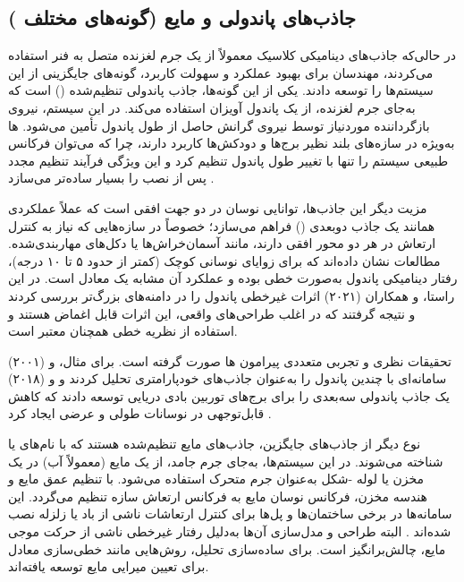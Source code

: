 \subsection{جاذب‌های پاندولی و مایع (گونه‌های مختلف )}

در حالی‌که جاذب‌های دینامیکی کلاسیک معمولاً از یک جرم لغزنده متصل به فنر استفاده می‌کردند، مهندسان برای بهبود عملکرد و سهولت کاربرد، گونه‌های جایگزینی از این سیستم‌ها را توسعه دادند. یکی از این گونه‌ها، جاذب پاندولی تنظیم‌شده () است که به‌جای جرم لغزنده، از یک پاندول آویزان استفاده می‌کند. در این سیستم، نیروی بازگرداننده موردنیاز توسط نیروی گرانش حاصل از طول پاندول تأمین می‌شود. ها به‌ویژه در سازه‌های بلند نظیر برج‌ها و دودکش‌ها کاربرد دارند، چرا که می‌توان فرکانس طبیعی سیستم را تنها با تغییر طول پاندول تنظیم کرد و این ویژگی فرآیند تنظیم مجدد پس از نصب را بسیار ساده‌تر می‌سازد \cite{saeed2023review, sun2018bi}.

مزیت دیگر این جاذب‌ها، توانایی نوسان در دو جهت افقی است که عملاً عملکردی همانند یک جاذب دوبعدی () فراهم می‌سازد؛ خصوصاً در سازه‌هایی که نیاز به کنترل ارتعاش در هر دو محور افقی دارند، مانند آسمان‌خراش‌ها یا دکل‌های مهاربندی‌شده. مطالعات نشان داده‌اند که برای زوایای نوسانی کوچک (کمتر از حدود ۵ تا ۱۰ درجه)، رفتار دینامیکی پاندول به‌صورت خطی بوده و عملکرد آن مشابه یک  معادل است. در این راستا،  و همکاران (۲۰۲۱) اثرات غیرخطی پاندول را در دامنه‌های بزرگ‌تر بررسی کردند و نتیجه گرفتند که در اغلب طراحی‌های واقعی، این اثرات قابل اغماض هستند و استفاده از نظریه خطی همچنان معتبر است.

تحقیقات نظری و تجربی متعددی پیرامون ها صورت گرفته است. برای مثال،  و  (۲۰۰۱) سامانه‌ای با چندین پاندول را به‌عنوان جاذب‌های خودپارامتری تحلیل کردند و  و  (۲۰۱۸) یک جاذب پاندولی سه‌بعدی را برای برج‌های توربین بادی دریایی توسعه دادند که کاهش قابل‌توجهی در نوسانات طولی و عرضی ایجاد کرد \cite{saeed2023review}.

نوع دیگر از جاذب‌های جایگزین، جاذب‌های مایع تنظیم‌شده هستند که با نام‌های  یا  شناخته می‌شوند. در این سیستم‌ها، به‌جای جرم جامد، از یک مایع (معمولاً آب) در یک مخزن یا لوله -شکل به‌عنوان جرم متحرک استفاده می‌شود. با تنظیم عمق مایع و هندسه مخزن، فرکانس نوسان مایع به فرکانس ارتعاش سازه تنظیم می‌گردد. این سامانه‌ها در برخی ساختمان‌ها و پل‌ها برای کنترل ارتعاشات ناشی از باد یا زلزله نصب شده‌اند \cite{lee2007real}. البته طراحی و مدل‌سازی آن‌ها به‌دلیل رفتار غیرخطی ناشی از حرکت موجی مایع، چالش‌برانگیز است. برای ساده‌سازی تحلیل، روش‌هایی مانند خطی‌سازی معادل برای تعیین میرایی مایع توسعه یافته‌اند.

